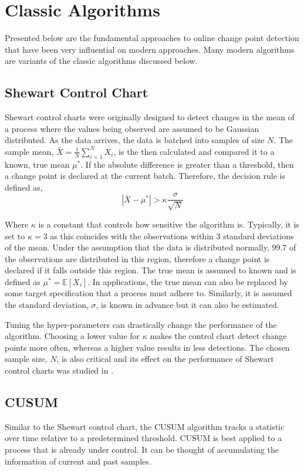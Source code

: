 \section{Classic Algorithms}
Presented below are the fundamental approaches to online change point detection that have been very influential on modern approaches. Many modern algorithms are variants of the classic algorithms discussed below.

\subsection{Shewart Control Chart}
Shewart control charts were originally designed to detect changes in the mean of a process where the values being observed are assumed to be Gaussian distributed. As the data arrives, the data is batched into samples of size $N$. The sample mean, $\bar{X}=\frac{1}{N} \sum_{i=1}^N X_i$, is the then calculated and compared it to a known, true mean $\mu^*$. If the absolute difference is greater than a threshold, then a change point is declared at the current batch. Therefore, the decision rule is defined as,
\begin{equation}
|\bar{X}-\mu^*| > \kappa \frac{\sigma}{\sqrt{N}}
\end{equation}

Where $\kappa$ is a constant that controls how sensitive the algorithm is. Typically, it is set to $\kappa=3$ as this coincides with the observations within $3$ standard deviations of the mean. Under the assumption that the data is distributed normally, $99.7$ of the observations are distributed in this region, therefore a change point is declared if it falls outside this region. The true mean is assumed to known and is defined as $\mu^* = \mathbb{E}[X_i]$. In applications, the true mean can also be replaced by some target specification that a process must adhere to. Similarly, it is assumed the standard deviation, $\sigma$, is known in advance but it can also be estimated.

Tuning the hyper-parameters can drastically change the performance of the algorithm. Choosing a lower value for $\kappa$ makes the control chart detect change points more often, whereas a higher value results in less detections. The chosen sample size, $N$, is also critical and its effect on the performance of Shewart control charts was studied in \cite{haridy2017effect}.

\subsection{CUSUM}
Similar to the Shewart control chart, the CUSUM algorithm tracks a statistic over time relative to a predetermined threshold. CUSUM is best applied to a process that is already under control. It can be thought of accumulating the information of current and past samples. 

